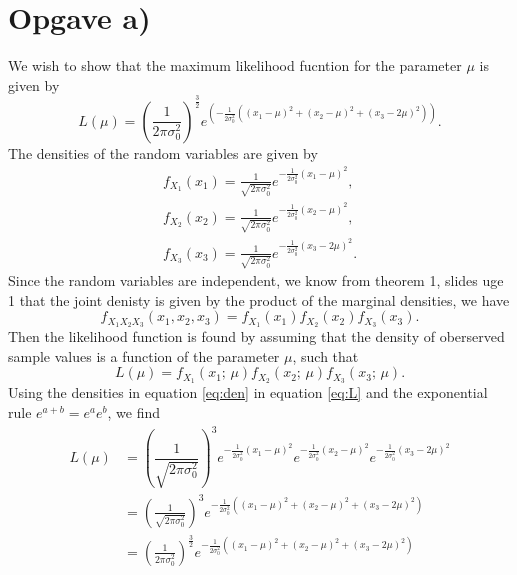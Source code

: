 \documentclass{article}
\begin{document}
\section*{Opgave a)}
We wish to show that the maximum likelihood fucntion for the parameter \( \mu \) is given by
\begin{equation}
    L(\mu) = \left(\frac{1}{2\pi \sigma_0^2}\right)^\frac{3}{2} e^{\left( -\frac{1}{2\sigma_0^2} \left( (x_1 - \mu)^2 + (x_2 - \mu)^2 + (x_3 - 2\mu)^2 \right) \right)}.
\end{equation}
The densities of the random variables are given by
\begin{equation}
    \begin{gathered}
        f_{X_1}(x_1) = \frac{1}{\sqrt{2\pi \sigma_0^2}} e^{-\frac{1}{2\sigma_0^2}(x_1 - \mu)^2}, \\
        f_{X_2}(x_2) = \frac{1}{\sqrt{2\pi \sigma_0^2}} e^{-\frac{1}{2\sigma_0^2}(x_2 - \mu)^2}, \\
        f_{X_3}(x_3) = \frac{1}{\sqrt{2\pi \sigma_0^2}} e^{-\frac{1}{2\sigma_0^2}(x_3 - 2\mu)^2}.
    \end{gathered}
    \label{eq:den}
\end{equation}
Since the random variables are independent, we know from theorem 1, slides uge 1 that the joint denisty is given by the product of the marginal densities, we have
\begin{equation}
    f_{X_1X_2X_3}(x_1, x_2, x_3) = f_{X_1}(x_1) f_{X_2}(x_2) f_{X_3}(x_3).
\end{equation}
Then the likelihood function is found by assuming that the density of oberserved sample values is a function of the parameter \( \mu \), such that
\begin{equation}
    L(\mu) =f_{X_1}(x_1;\, \mu) f_{X_2}(x_2;\, \mu) f_{X_3}(x_3;\, \mu).
    \label{eq:L}
\end{equation}
Using the densities in equation \eqref{eq:den} in equation \eqref{eq:L} and the exponential rule \( e^{a + b} = e^a e^b \), we find
\begin{equation}
    \begin{aligned}
        L(\mu) &= \left( \dfrac{1}{\sqrt{2\pi \sigma_0^2}} \right)^3 e^{-\frac{1}{2\sigma_0^2}(x_1 - \mu)^2} e^{-\frac{1}{2\sigma_0^2}(x_2 - \mu)^2} e^{-\frac{1}{2\sigma_0^2}(x_3 - 2\mu)^2} \\
        &= \left( \frac{1}{\sqrt{2\pi \sigma_0^2}} \right)^3 e^{-\frac{1}{2\sigma_0^2} \left( (x_1 - \mu)^2 + (x_2 - \mu)^2 + (x_3 - 2\mu)^2 \right)}\\
        &= \left( \frac{1}{2\pi \sigma_0^2} \right)^\frac{3}{2} e^{-\frac{1}{2\sigma_0^2} \left( (x_1 - \mu)^2 + (x_2 - \mu)^2 + (x_3 - 2\mu)^2 \right)}
    \end{aligned}
\end{equation}
\end{document}

